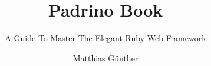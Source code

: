 \documentclass[14pt]{extbook} %
\title{Padrino Book}
\subtitle{A Guide To Master The Elegant Ruby Web Framework}
\author{Matthias Günther}
\date{}
\begin{document}

\frontmatter
\maketitle
\tableofcontents

\mainmatter






\
\end{document}
